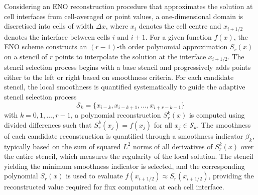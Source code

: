 Considering an ENO reconstruction procedure that approximates the solution at cell interfaces from cell-averaged or point values, a one-dimensional domain is discretised into cells of width $\Delta x$, where $x_i$ denotes the cell centre and $x_{i+1/2}$ denotes the interface between cells $i$ and $i+1$. For a given function $f(x)$, the ENO scheme constructs an $(r-1)$-th order polynomial approximation $S_r(x)$ on a stencil of $r$ points to interpolate the solution at the interface $x_{i+1/2}$. The stencil selection process begins with a base stencil and progressively adds points either to the left or right based on smoothness criteria. For each candidate stencil, the local smoothness is quantified systematically to guide the adaptive stencil selection process
\begin{equation}
\mathcal{S}_k = \{x_{i-k}, x_{i-k+1}, \ldots, x_{i+r-k-1}\}
\end{equation}
with $k = 0, 1, \ldots, r-1$, a polynomial reconstruction $S_r^k(x)$ is computed using divided differences such that $S_r^k(x_j) = f(x_j)$ for all $x_j \in \mathcal{S}_k$. The smoothness of each candidate reconstruction is quantified through a smoothness indicator $\beta_k$, typically based on the sum of squared $L^2$ norms of all derivatives of $S_r^k(x)$ over the entire stencil, which measures the regularity of the local solution. The stencil yielding the minimum smoothness indicator is selected, and the corresponding polynomial $S_r(x)$ is used to evaluate $f(x_{i+1/2}) \approx S_r(x_{i+1/2})$, providing the reconstructed value required for flux computation at each cell interface.


